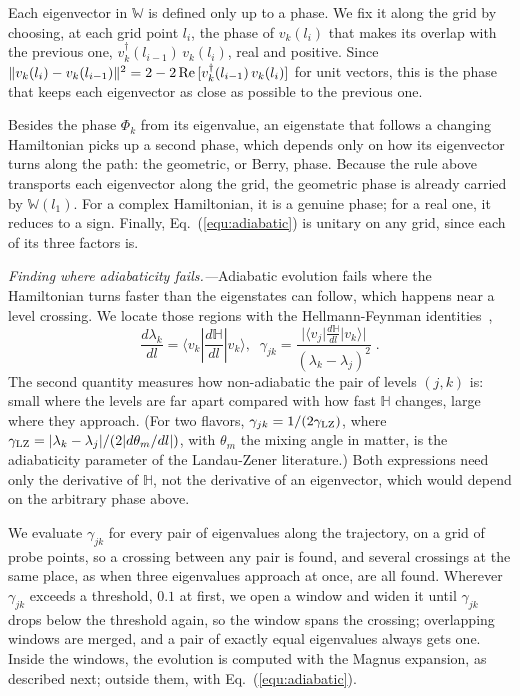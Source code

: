 \documentclass[final,5p,times,twocolumn,sort,compress]{elsarticle}
\makeatletter
\newcommand{\eq}{Eq.}
\DeclareRobustCommand{\_}{%
  \ifmmode\nfss@text{\textunderscore}\else\textunderscore\allowbreak\fi}
\newcommand{\equ}[1]{\eq~(\ref{equ:#1})}
\makeatother
\begin{document}
Each eigenvector in $\mathbb{W}$ is defined only up to a phase. We fix it along the grid by choosing, at each grid point $l_i$, the phase of $v_k(l_i)$ that makes its overlap with the previous one, $v_k^\dagger(l_{i-1})\, v_k(l_i)$, real and positive. Since $\lVert v_k(l_i) - v_k(l_{i-1}) \rVert^2 = 2 - 2\,{\rm Re}\,[v_k^\dagger(l_{i-1})\, v_k(l_i)]$ for unit vectors, this is the phase that keeps each eigenvector as close as possible to the previous one.

Besides the phase $\Phi_k$ from its eigenvalue, an eigenstate that follows a changing Hamiltonian picks up a second phase, which depends only on how its eigenvector turns along the path: the geometric, or Berry, phase. Because the rule above transports each eigenvector along the grid, the geometric phase is already carried by $\mathbb{W}(l_1)$. For a complex Hamiltonian, it is a genuine phase; for a real one, it reduces to a sign. Finally, \equ{adiabatic} is unitary on any grid, since each of its three factors is.

\smallskip

\textit{Finding where adiabaticity fails.---}Adiabatic evolution fails where the Hamiltonian turns faster than the eigenstates can follow, which happens near a level crossing. We locate those regions with the Hellmann-Feynman identities\ \cite{Feynman:1939zza},
\begin{equation}
 \label{equ:hf}
 \frac{d\lambda_k}{dl} = \langle v_k \left\vert \frac{d\mathbb{H}}{dl} \right\vert v_k \rangle ,
 \;\;
 \gamma_{jk} = \frac{\lvert\langle v_j \lvert \tfrac{d\mathbb{H}}{dl} \rvert v_k \rangle\rvert}
 {(\lambda_k - \lambda_j)^2} \;.
\end{equation}
The second quantity measures how non-adiabatic the pair of levels $(j, k)$ is: small where the levels are far apart compared with how fast $\mathbb{H}$ changes, large where they approach. (For two flavors, $\gamma_{jk} = 1/(2\gamma_{\rm LZ})$, where $\gamma_{\rm LZ} = \lvert \lambda_k - \lambda_j \rvert / (2\lvert d\theta_m/dl \rvert)$, with $\theta_m$ the mixing angle in matter, is the adiabaticity parameter of the Landau-Zener literature.) Both expressions need only the derivative of $\mathbb{H}$, not the derivative of an eigenvector, which would depend on the arbitrary phase above.

We evaluate $\gamma_{jk}$ for every pair of eigenvalues along the trajectory, on a grid of probe points, so a crossing between any pair is found, and several crossings at the same place, as when three eigenvalues approach at once, are all found. Wherever $\gamma_{jk}$ exceeds a threshold, $0.1$ at first, we open a window and widen it until $\gamma_{jk}$ drops below the threshold again, so the window spans the crossing; overlapping windows are merged, and a pair of exactly equal eigenvalues always gets one. Inside the windows, the evolution is computed with the Magnus expansion, as described next; outside them, with \equ{adiabatic}.
\end{document}
